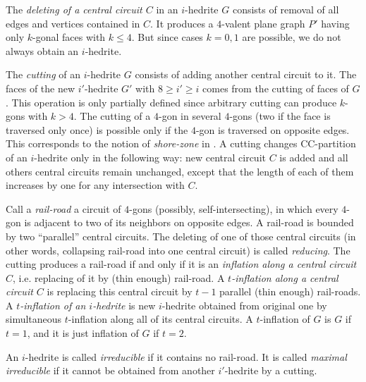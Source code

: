 \documentclass[12pt]{article}
\begin{document}
The {\em deleting of a central circuit $C$} in an $i$-hedrite $G$ consists 
of removal of all edges and vertices contained in $C$. It produces a 
$4$-valent plane graph $P'$ having only $k$-gonal faces 
with $k \leq 4$. But since cases $k=0,1$ are possible, we do not
always obtain an $i$-hedrite.


The {\em cutting} of an $i$-hedrite $G$ consists of adding another central 
circuit to it. The faces of the new $i'$-hedrite $G'$ with $8\geq i'\geq i$ 
comes from the cutting of faces of $G$. This operation is only partially
defined since arbitrary cutting can produce $k$-gons with $k>4$. The 
cutting of a $4$-gon in several $4$-gons (two if the face
is traversed only once) is possible only if the $4$-gon is traversed 
on opposite edges. This corresponds to the notion of {\it shore-zone} 
in \cite{DSt}.
A cutting changes CC-partition of an $i$-hedrite only in the following 
way: new central circuit $C$ is added and all others central circuits 
remain unchanged, except that the length of each of them increases by one 
for any intersection with $C$. 


Call a {\em rail-road} a circuit of $4$-gons (possibly, self-intersecting), 
in which every $4$-gon is adjacent to two of its neighbors on opposite
edges. A rail-road is bounded by two ``parallel'' central circuits.
The deleting of  one of those central circuits (in other words, collapsing
rail-road into one central circuit) is called {\em reducing}.
The cutting produces a rail-road if and only if it is an {\em inflation 
along a central circuit $C$}, i.e. replacing of it by (thin enough) 
rail-road. A {\em $t$-inflation along a central circuit $C$} is replacing
this central circuit by $t-1$ parallel (thin enough) rail-roads.
A {\em $t$-inflation of an $i$-hedrite} is new $i$-hedrite
obtained from original one by simultaneous $t$-inflation along all
of its central circuits. 
A $t$-inflation of $G$ is $G$ if $t=1$, and it is just inflation of $G$ 
if $t=2$.


An $i$-hedrite is called {\em irreducible} if it contains no 
rail-road. It is called {\em maximal irreducible} if it cannot be
obtained from another $i'$-hedrite by a cutting.

\end{document}
